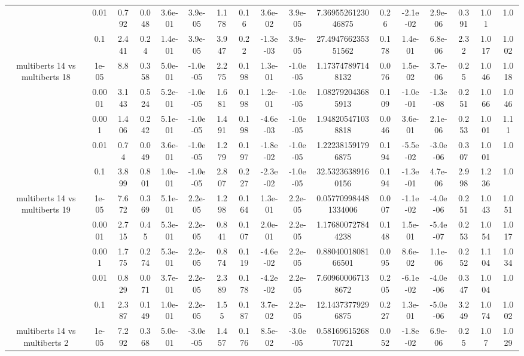 \begin{tabular}{|c|c|c|c|c|c|c|c|c|c|c|c|c|c|c|c|c|}
 & 0.01 & 0.792 & 0.048 & 3.6e-01 & 3.9e-05 & 1.178 & 0.16 & 3.6e-02 & 3.9e-05 & 7.3695526123046875 & 0.26 & -2.1e-02 & 2.9e-06 & 0.391 & 1.01 & 1.0 \\
 & 0.1 & 2.441 & 0.24 & 1.4e-01 & 3.9e-05 & 3.947 & 0.22 & -1.3e-03 & 3.9e-05 & 27.494766235351562 & 0.178 & 1.4e-01 & 6.8e-06 & 2.32 & 1.017 & 1.002 \\
\hline
\multirow{5}{*}{multiberts 14 vs multiberts 18} & 1e-05 & 8.8 & 0.358 & 5.0e-01 & -1.0e-05 & 2.275 & 0.198 & 1.3e-01 & -1.0e-05 & 1.173747897148132 & 0.076 & 1.5e-02 & 3.7e-06 & 0.25 & 1.046 & 1.018 \\
 & 0.0001 & 3.143 & 0.524 & 5.2e-01 & -1.0e-05 & 1.681 & 0.198 & 1.2e-01 & -1.0e-05 & 1.082792043685913 & 0.109 & -1.0e-01 & -1.3e-08 & 0.251 & 1.066 & 1.046 \\
 & 0.001 & 1.406 & 0.242 & 5.1e-01 & -1.0e-05 & 1.491 & 0.198 & -4.6e-03 & -1.0e-05 & 1.948205471038818 & 0.046 & 3.6e-01 & 2.1e-06 & 0.253 & 1.001 & 1.11 \\
 & 0.01 & 0.74 & 0.049 & 3.6e-01 & -1.0e-05 & 1.279 & 0.197 & -1.8e-02 & -1.0e-05 & 1.222381591796875 & 0.194 & -5.5e-02 & -3.0e-06 & 0.307 & 1.001 & 1.0 \\
 & 0.1 & 3.899 & 0.801 & 1.0e-01 & -1.0e-05 & 2.807 & 0.227 & -2.3e-02 & -1.0e-05 & 32.53236389160156 & 0.194 & -1.3e-01 & 4.7e-06 & 2.998 & 1.236 & 1.0 \\
\hline
\multirow{5}{*}{multiberts 14 vs multiberts 19} & 1e-05 & 7.672 & 0.369 & 5.1e-01 & 2.2e-05 & 1.298 & 0.164 & 1.3e-01 & 2.2e-05 & 0.057709984481334006 & 0.007 & -1.1e-02 & -4.0e-06 & 0.251 & 1.043 & 1.051 \\
 & 0.0001 & 2.715 & 0.45 & 5.3e-01 & 2.2e-05 & 0.841 & 0.107 & 2.0e-01 & 2.2e-05 & 1.176800727844238 & 0.148 & 1.5e-01 & -5.4e-07 & 0.253 & 1.054 & 1.017 \\
 & 0.001 & 1.775 & 0.274 & 5.3e-01 & 2.2e-05 & 0.874 & 0.119 & -4.6e-02 & 2.2e-05 & 0.8804001808166501 & 0.095 & 8.6e-02 & 1.1e-06 & 0.252 & 1.104 & 1.034 \\
 & 0.01 & 0.829 & 0.071 & 3.7e-01 & 2.2e-05 & 2.389 & 0.178 & -4.2e-02 & 2.2e-05 & 7.609600067138672 & 0.205 & -6.1e-02 & -4.0e-06 & 0.347 & 1.004 & 1.0 \\
 & 0.1 & 2.387 & 0.149 & 1.0e-01 & 2.2e-05 & 1.55 & 0.187 & 3.7e-02 & 2.2e-05 & 12.14373779296875 & 0.227 & 1.3e-01 & -5.0e-06 & 3.249 & 1.074 & 1.002 \\
\hline
\multirow{5}{*}{multiberts 14 vs multiberts 2} & 1e-05 & 7.292 & 0.368 & 5.0e-01 & -3.0e-05 & 1.457 & 0.176 & 8.5e-02 & -3.0e-05 & 0.5816961526870721 & 0.052 & -1.8e-02 & 6.9e-06 & 0.25 & 1.07 & 1.029 \\

\end{tabular}
